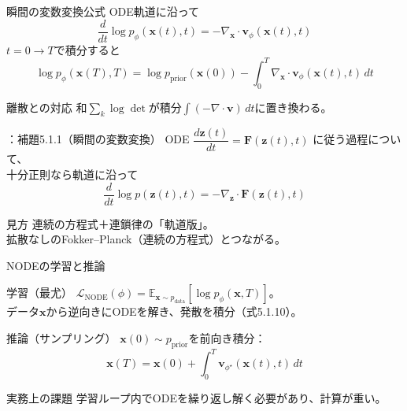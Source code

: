 \asmain
\begin{frame}{瞬間の変数変換公式}
    ODE軌道に沿って
    \[
        \dfrac{d}{dt}\log p_\phi(\bm{x}(t),t)
        =
        -\nabla_{\bm{x}}\cdot\bm{v}_\phi(\bm{x}(t),t)
    \]
    $t=0\to T$で積分すると
    \[
        \log p_\phi(\bm{x}(T),T)
        =
        \log p_{\mathrm{prior}}(\bm{x}(0))
        -
        \int_0^{T}
        \nabla_{\bm{x}}\cdot\bm{v}_\phi(\bm{x}(t),t)\,dt
        \tag{5.1.8}
    \]
    \begin{block}{離散との対応}
        和$\sum_k\log\det$が積分$\int(-\nabla\cdot\bm{v})\,dt$に置き換わる。
    \end{block}
\end{frame}
\assuppl
\begin{frame}{\supplmark：補題5.1.1（瞬間の変数変換）}
    ODE $\dfrac{d\bm{z}(t)}{dt}=\bm{F}(\bm{z}(t),t)$ に従う過程について、\\
    十分正則なら軌道に沿って
    \[
        \dfrac{d}{dt}\log p(\bm{z}(t),t)
        =
        -\nabla_{\bm{z}}\cdot\bm{F}(\bm{z}(t),t)
        \tag{5.1.9}
    \]
    \begin{exampleblock}{見方}
        連続の方程式＋連鎖律の「軌道版」。\\
        拡散なしのFokker--Planck（連続の方程式）とつながる。
    \end{exampleblock}
\end{frame}
\asmain
\begin{frame}{NODEの学習と推論}
    \begin{block}{学習（最尤）}
        $\mathcal{L}_{\mathrm{NODE}}(\phi)
        =\mathbb{E}_{\bm{x}\sim p_{\mathrm{data}}}[\log p_\phi(\bm{x},T)]$。\\
        データ$\bm{x}$から逆向きにODEを解き、発散を積分（式5.1.10）。
    \end{block}
    \begin{block}{推論（サンプリング）}
        $\bm{x}(0)\sim p_{\mathrm{prior}}$を前向き積分：
        \[
            \bm{x}(T)
            =
            \bm{x}(0)
            +
            \int_0^{T}\bm{v}_{\phi^\star}(\bm{x}(t),t)\,dt
        \]
    \end{block}
    \begin{alertblock}{実務上の課題}
        学習ループ内でODEを繰り返し解く必要があり、計算が重い。
    \end{alertblock}
\end{frame}
